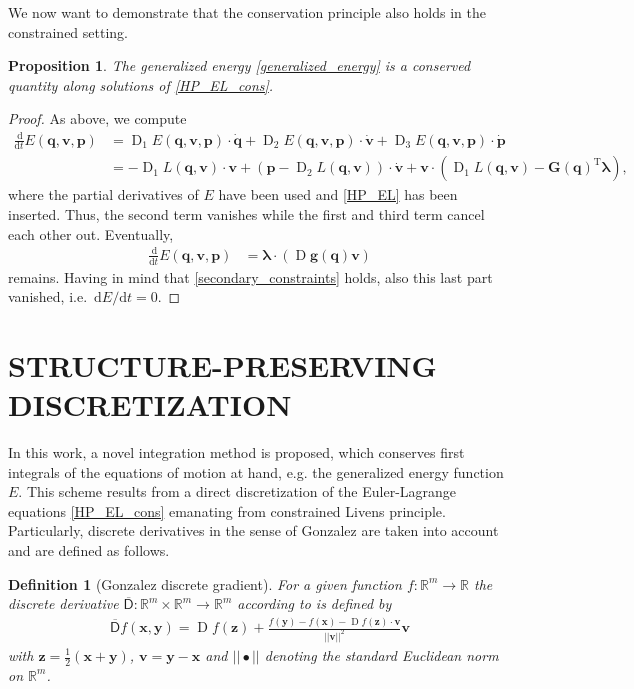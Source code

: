 \documentclass{multibody2023_full_paper}
\newtheorem{definition}[theorem]{Definition}
\newtheorem{proposition}[theorem]{Proposition}
\newcommand{\dt}{\mathrm{d}t}
\renewcommand{\d}[1][]{\ensuremath{\,\mathrm{d}#1}}
\DeclareMathOperator{\D}{D}
\newcommand{\transp}{^\mathrm{T}}
\renewcommand{\vec}[1]{\ensuremath{\mbox{$\mathbf{#1}$}}}
\newcommand{\DG}{\overline{\mathsf{D}}}
\begin{document}
We now want to demonstrate that the conservation principle also holds in the constrained setting.

\begin{proposition}
    The generalized energy \eqref{generalized_energy} is a conserved quantity along solutions of \eqref{HP_EL_cons}.
\end{proposition}

\begin{proof}
    As above, we compute
    \begin{align}
        \frac{\d}{\dt}E(\vec{q},\vec{v},\vec{p}) & = \D_1 E(\vec{q},\vec{v},\vec{p}) \cdot \dot{\vec{q}} + \D_2 E(\vec{q},\vec{v},\vec{p}) \cdot \dot{\vec{v}} + \D_3 E(\vec{q},\vec{v},\vec{p}) \cdot \dot{\vec{p}}                        \\
                                                 & = -\D_1 L(\vec{q},\vec{v}) \cdot \vec{v} + (\vec{p} - \D_2 L(\vec{q},\vec{v})) \cdot \dot{\vec{v}} + \vec{v} \cdot ( \D_1 L(\vec{q},\vec{v}) - \vec{G}(\vec{q})\transp {\bm \lambda} ) ,
    \end{align}
    where the partial derivatives of $E$ have been used and \eqref{HP_EL} has been inserted. Thus, the second term vanishes while the first and third term cancel each other out. Eventually,
    \begin{align}
        \frac{\d}{\dt}E(\vec{q},\vec{v},\vec{p}) & = {\bm \lambda} \cdot (\D\vec{g}(\vec{q})\vec{v})
    \end{align}
    remains. Having in mind that \eqref{secondary_constraints} holds, also this last part vanished, i.e. $\d E / \dt = 0$.
\end{proof}

\section{STRUCTURE-PRESERVING DISCRETIZATION}\label{sec_discrete}
In this work, a novel integration method is proposed, which conserves first integrals of the equations of motion at hand, e.g. the generalized energy function $E$. This scheme results from a direct discretization of the Euler-Lagrange equations \eqref{HP_EL_cons} emanating from constrained Livens principle. Particularly, discrete derivatives in the sense of Gonzalez \cite{gonzalez_time_1996} are taken into account and are defined as follows.

\begin{definition}[Gonzalez discrete gradient]
    For a given function $f : \mathbb{R}^m \rightarrow \mathbb{R} $ the discrete derivative $ \DG : \mathbb{R}^m \times \mathbb{R}^m \rightarrow \mathbb{R}^m $ according to \cite{gonzalez_time_1996} is defined by
    \begin{align} \label{eq:DD-Gonzalez}
        \DG f(\vec{x},\vec{y}) = \D f(\vec{z}) + \frac{f(\vec{y}) - f(\vec{x}) -  \D f(
            \vec{z}) \cdot \vec{v}  }{ ||\vec{v}||^2 } \vec{v}
    \end{align}
    with $\vec{z} = \frac{1}{2}(\vec{x} +\vec{y})$, $\vec{v} = \vec{y} - \vec{x}$ and $|| \bullet ||$ denoting the standard Euclidean norm on $\mathbb{R}^m$.
\end{definition}
\end{document}
